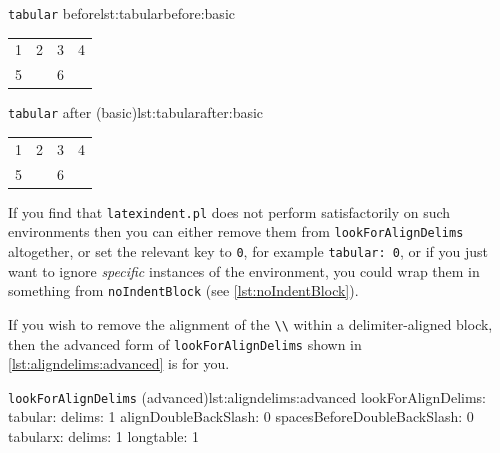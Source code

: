\documentclass[11pt]{article}
\begin{document}
\begin{itemize}
	\begin{minipage}{.5\textwidth}
		\begin{cmhlistings}[style=demo,columns=fixed]{\lstinline!tabular! before}{lst:tabularbefore:basic}
\begin{tabular}{cccc}
1&	2 &3       &4\\
5& &6       &\\
\end{tabular}
		\end{cmhlistings}
	\end{minipage}%
	\begin{minipage}{.5\textwidth}
		\begin{cmhlistings}[style=demo,columns=fixed]{\lstinline!tabular! after (basic)}{lst:tabularafter:basic}
\begin{tabular}{cccc}
 1 & 2 & 3 & 4 \\
 5 &   & 6 &   \\
\end{tabular}
		\end{cmhlistings}
	\end{minipage}

	If you find that \lstinline!latexindent.pl! does not perform satisfactorily on such
	environments then you can either remove them from \lstinline!lookForAlignDelims! altogether, or set the relevant key to \lstinline!0!, for example \lstinline!tabular: 0!, or if you just want to ignore \emph{specific}
	instances of the environment, you could wrap them in something from \lstinline!noIndentBlock! (see \cref{lst:noIndentBlock}).

    If you wish to remove the alignment of the \lstinline!\\! within a delimiter-aligned block, then the
    advanced form of \lstinline!lookForAlignDelims! shown in \cref{lst:aligndelims:advanced} is for you. 
	      \begin{cmhlistings}[style=yaml]{\lstinline!lookForAlignDelims! (advanced)}{lst:aligndelims:advanced}
lookForAlignDelims:
   tabular: 
      delims: 1
      alignDoubleBackSlash: 0
      spacesBeforeDoubleBackSlash: 0
   tabularx:
      delims: 1
   longtable: 1
	\end{cmhlistings}


\end{itemize}
\end{document}
